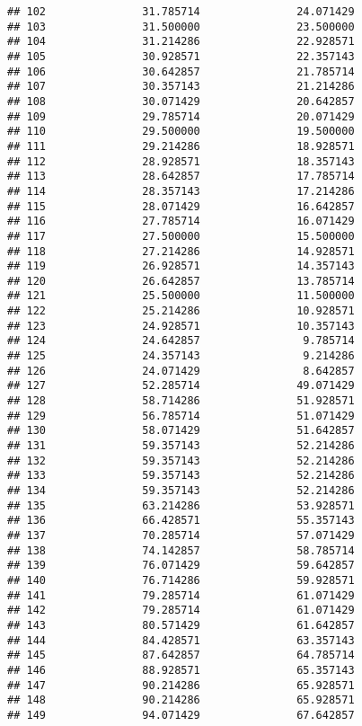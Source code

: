 \documentclass[]{article}
\begin{document}
\begin{verbatim}
## 102               31.785714               24.071429
## 103               31.500000               23.500000
## 104               31.214286               22.928571
## 105               30.928571               22.357143
## 106               30.642857               21.785714
## 107               30.357143               21.214286
## 108               30.071429               20.642857
## 109               29.785714               20.071429
## 110               29.500000               19.500000
## 111               29.214286               18.928571
## 112               28.928571               18.357143
## 113               28.642857               17.785714
## 114               28.357143               17.214286
## 115               28.071429               16.642857
## 116               27.785714               16.071429
## 117               27.500000               15.500000
## 118               27.214286               14.928571
## 119               26.928571               14.357143
## 120               26.642857               13.785714
## 121               25.500000               11.500000
## 122               25.214286               10.928571
## 123               24.928571               10.357143
## 124               24.642857                9.785714
## 125               24.357143                9.214286
## 126               24.071429                8.642857
## 127               52.285714               49.071429
## 128               58.714286               51.928571
## 129               56.785714               51.071429
## 130               58.071429               51.642857
## 131               59.357143               52.214286
## 132               59.357143               52.214286
## 133               59.357143               52.214286
## 134               59.357143               52.214286
## 135               63.214286               53.928571
## 136               66.428571               55.357143
## 137               70.285714               57.071429
## 138               74.142857               58.785714
## 139               76.071429               59.642857
## 140               76.714286               59.928571
## 141               79.285714               61.071429
## 142               79.285714               61.071429
## 143               80.571429               61.642857
## 144               84.428571               63.357143
## 145               87.642857               64.785714
## 146               88.928571               65.357143
## 147               90.214286               65.928571
## 148               90.214286               65.928571
## 149               94.071429               67.642857

\end{verbatim}
\end{document}
